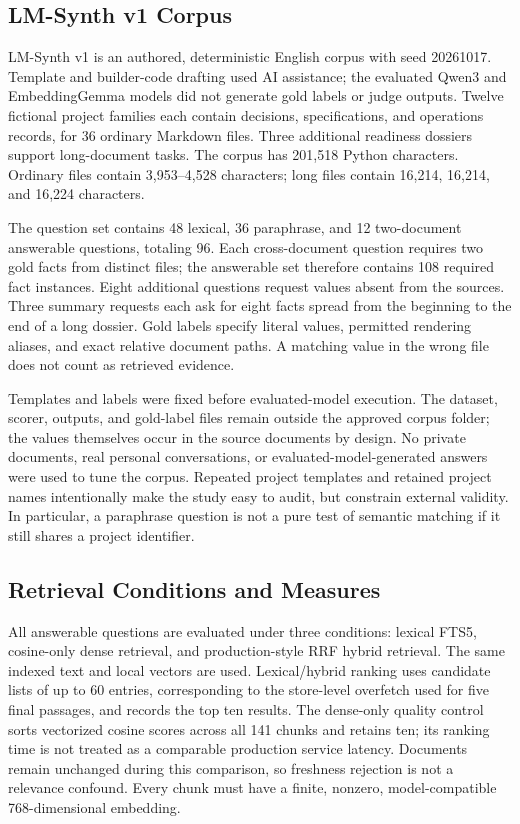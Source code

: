 \documentclass[conference,letterpaper]{IEEEtran}
\begin{document}
\subsection{LM-Synth v1 Corpus}
LM-Synth v1 is an authored, deterministic English corpus with seed 20261017. Template and builder-code drafting used AI assistance; the evaluated Qwen3 and EmbeddingGemma models did not generate gold labels or judge outputs. Twelve fictional project families each contain decisions, specifications, and operations records, for 36 ordinary Markdown files. Three additional readiness dossiers support long-document tasks. The corpus has 201,518 Python characters. Ordinary files contain 3,953--4,528 characters; long files contain 16,214, 16,214, and 16,224 characters.

The question set contains 48 lexical, 36 paraphrase, and 12 two-document answerable questions, totaling 96. Each cross-document question requires two gold facts from distinct files; the answerable set therefore contains 108 required fact instances. Eight additional questions request values absent from the sources. Three summary requests each ask for eight facts spread from the beginning to the end of a long dossier. Gold labels specify literal values, permitted rendering aliases, and exact relative document paths. A matching value in the wrong file does not count as retrieved evidence.

Templates and labels were fixed before evaluated-model execution. The dataset, scorer, outputs, and gold-label files remain outside the approved corpus folder; the values themselves occur in the source documents by design. No private documents, real personal conversations, or evaluated-model-generated answers were used to tune the corpus. Repeated project templates and retained project names intentionally make the study easy to audit, but constrain external validity. In particular, a paraphrase question is not a pure test of semantic matching if it still shares a project identifier.

\subsection{Retrieval Conditions and Measures}
All answerable questions are evaluated under three conditions: lexical FTS5, cosine-only dense retrieval, and production-style RRF hybrid retrieval. The same indexed text and local vectors are used. Lexical/hybrid ranking uses candidate lists of up to 60 entries, corresponding to the store-level overfetch used for five final passages, and records the top ten results. The dense-only quality control sorts vectorized cosine scores across all 141 chunks and retains ten; its ranking time is not treated as a comparable production service latency. Documents remain unchanged during this comparison, so freshness rejection is not a relevance confound. Every chunk must have a finite, nonzero, model-compatible 768-dimensional embedding.
\end{document}
